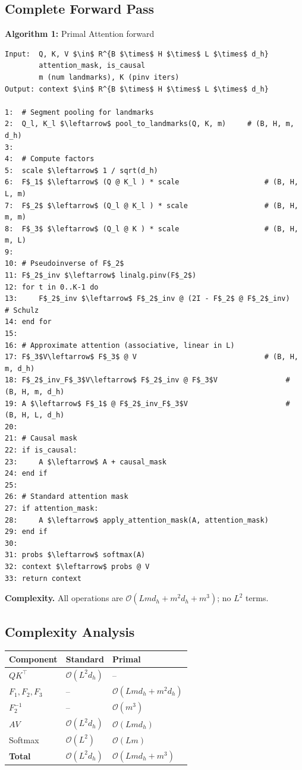 \subsection{Complete Forward Pass}

\textbf{Algorithm 1:} Primal Attention forward
\begin{lstlisting}
Input:  Q, K, V $\in$ R^{B $\times$ H $\times$ L $\times$ d_h}
        attention_mask, is_causal
        m (num landmarks), K (pinv iters)
Output: context $\in$ R^{B $\times$ H $\times$ L $\times$ d_h}

1:  # Segment pooling for landmarks
2:  Q_l, K_l $\leftarrow$ pool_to_landmarks(Q, K, m)     # (B, H, m, d_h)
3:
4:  # Compute factors
5:  scale $\leftarrow$ 1 / sqrt(d_h)
6:  F$_1$ $\leftarrow$ (Q @ K_l ) * scale                    # (B, H, L, m)
7:  F$_2$ $\leftarrow$ (Q_l @ K_l ) * scale                  # (B, H, m, m)
8:  F$_3$ $\leftarrow$ (Q_l @ K ) * scale                    # (B, H, m, L)
9:
10: # Pseudoinverse of F$_2$
11: F$_2$_inv $\leftarrow$ linalg.pinv(F$_2$)
12: for t in 0..K-1 do
13:     F$_2$_inv $\leftarrow$ F$_2$_inv @ (2I - F$_2$ @ F$_2$_inv)   # Schulz
14: end for
15:
16: # Approximate attention (associative, linear in L)
17: F$_3$V\leftarrow$ F$_3$ @ V                              # (B, H, m, d_h)
18: F$_2$_inv_F$_3$V\leftarrow$ F$_2$_inv @ F$_3$V                # (B, H, m, d_h)
19: A $\leftarrow$ F$_1$ @ F$_2$_inv_F$_3$V                       # (B, H, L, d_h)
20:
21: # Causal mask
22: if is_causal:
23:     A $\leftarrow$ A + causal_mask
24: end if
25:
26: # Standard attention mask
27: if attention_mask:
28:     A $\leftarrow$ apply_attention_mask(A, attention_mask)
29: end if
30:
31: probs $\leftarrow$ softmax(A)
32: context $\leftarrow$ probs @ V
33: return context
\end{lstlisting}

\textbf{Complexity.} All operations are $\mathcal{O}(L m d_h + m^2 d_h + m^3)$; no 
$L^2$ terms.

\subsection{Complexity Analysis}

\begin{table}[H]
\centering
\small
\begin{tabular}{lll}
\toprule
\textbf{Component} & \textbf{Standard} & \textbf{Primal} \\
\midrule
$Q K^\top$ & $\mathcal{O}(L^2 d_h)$ & -- \\
$F_1, F_2, F_3$ & -- & $\mathcal{O}(L m d_h + m^2 d_h)$ \\
$F_2^{-1}$ & -- & $\mathcal{O}(m^3)$ \\
$A V$ & $\mathcal{O}(L^2 d_h)$ & $\mathcal{O}(L m d_h)$ \\
Softmax & $\mathcal{O}(L^2)$ & $\mathcal{O}(L m)$ \\
\textbf{Total} & $\mathcal{O}(L^2 d_h)$ & $\mathcal{O}(L m d_h + m^3)$ \\
\bottomrule
\end{tabular}
\end{table}

